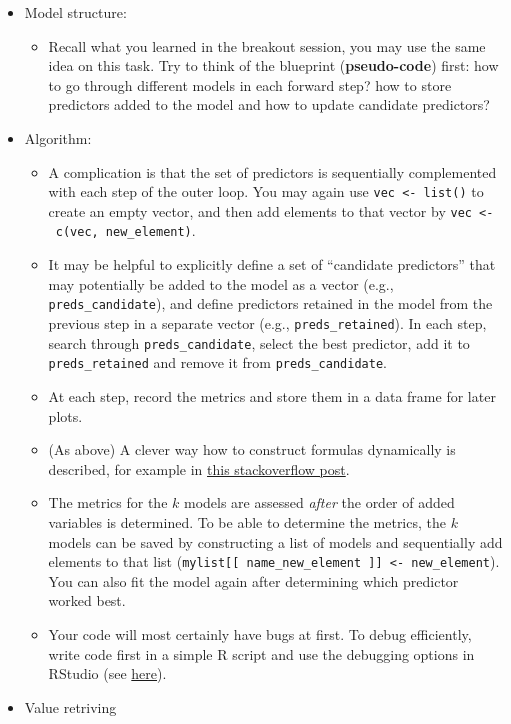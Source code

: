 \documentclass[
]{book}
\providecommand{\tightlist}{%
  \setlength{\itemsep}{0pt}\setlength{\parskip}{0pt}}
\begin{document}
\begin{itemize}
\item
  Model structure:

  \begin{itemize}
  \tightlist
  \item
    Recall what you learned in the breakout session, you may use the same idea on this task. Try to think of the blueprint (\textbf{pseudo-code}) first: how to go through different models in each forward step? how to store predictors added to the model and how to update candidate predictors?
  \end{itemize}
\item
  Algorithm:

  \begin{itemize}
  \item
    A complication is that the set of predictors is sequentially complemented with each step of the outer loop. You may again use \texttt{vec\ \textless{}-\ list()} to create an empty vector, and then add elements to that vector by \texttt{vec\ \textless{}-\ c(vec,\ new\_element)}.
  \item
    It may be helpful to explicitly define a set of ``candidate predictors'' that may potentially be added to the model as a vector (e.g., \texttt{preds\_candidate}), and define predictors retained in the model from the previous step in a separate vector (e.g., \texttt{preds\_retained}). In each step, search through \texttt{preds\_candidate}, select the best predictor, add it to \texttt{preds\_retained} and remove it from \texttt{preds\_candidate}.
  \item
    At each step, record the metrics and store them in a data frame for later plots.
  \item
    (As above) A clever way how to construct formulas dynamically is described, for example in \href{https://stackoverflow.com/questions/4951442/formula-with-dynamic-number-of-variables}{this stackoverflow post}.
  \item
    The metrics for the \(k\) models are assessed \emph{after} the order of added variables is determined. To be able to determine the metrics, the \(k\) models can be saved by constructing a list of models and sequentially add elements to that list (\texttt{mylist{[}{[}\ name\_new\_element\ {]}{]}\ \textless{}-\ new\_element}). You can also fit the model again after determining which predictor worked best.
  \item
    Your code will most certainly have bugs at first. To debug efficiently, write code first in a simple R script and use the debugging options in RStudio (see \href{https://support.rstudio.com/hc/en-us/articles/205612627-Debugging-with-RStudio}{here}).
  \end{itemize}
\item
  Value retriving


\end{itemize}
\end{document}
